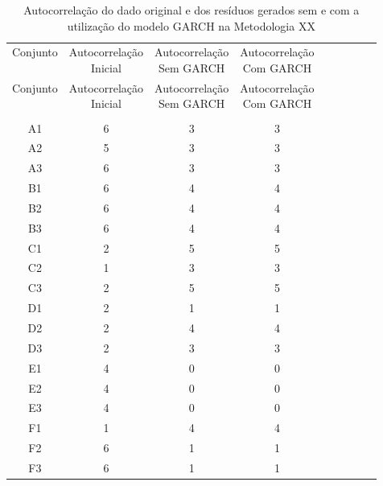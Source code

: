 \begin{center}
\begin{longtable}{ccccc|cccc}
\toprule
\rowcolor{white}
\caption[Metodologia XX: evolução da autocorrelação]{Autocorrelação do dado
original e dos resíduos gerados sem e com a utilização do modelo GARCH na
Metodologia XX} \label{tab:EvolucaoAutocorrelacaoMet20}\\
\midrule
Conjunto & \specialcell{Autocorrelação\\Inicial} & \specialcell{Autocorrelação\\Sem
GARCH} & \specialcell{Autocorrelação\\Com GARCH} \\
\midrule
\endfirsthead 
\midrule
\rowcolor{white}
Conjunto & \specialcell{Autocorrelação\\Inicial} & \specialcell{Autocorrelação\\Sem
GARCH} & \specialcell{Autocorrelação\\Com GARCH} \\
\toprule
\endhead
\midrule \\ %
\endfoot
\bottomrule 
\endlastfoot
A1    & 6     & 3     & 3 \\
A2    & 5     & 3     & 3 \\
A3    & 6     & 3     & 3 \\
B1    & 6     & 4     & 4 \\
B2    & 6     & 4     & 4 \\
B3    & 6     & 4     & 4 \\
C1    & 2     & 5     & 5 \\
C2    & 1     & 3     & 3 \\
C3    & 2     & 5     & 5 \\
D1    & 2     & 1     & 1 \\
D2    & 2     & 4     & 4 \\
D3    & 2     & 3     & 3 \\
E1    & 4     & 0     & 0 \\
E2    & 4     & 0     & 0 \\
E3    & 4     & 0     & 0 \\
F1    & 1     & 4     & 4 \\
F2    & 6     & 1     & 1 \\
F3    & 6     & 1     & 1 \\

\end{longtable}
\end{center}

